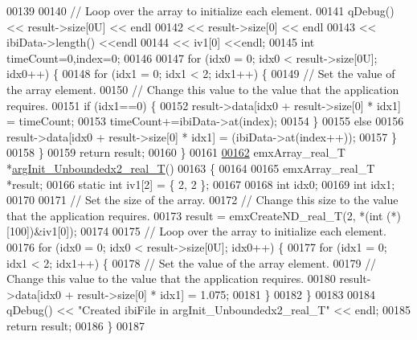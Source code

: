 \begin{DoxyCode}
00139 
00140     \textcolor{comment}{// Loop over the array to initialize each element.}
00141     qDebug() << result->size[0U] << endl
00142             << result->size[0] << endl
00143             << ibiData->length() <<endl
00144             << iv1[0] <<endl;
00145     \textcolor{keywordtype}{int} timeCount=0,index=0;
00146 
00147     \textcolor{keywordflow}{for} (idx0 = 0; idx0 < result->size[0U]; idx0++) \{
00148         \textcolor{keywordflow}{for} (idx1 = 0; idx1 < 2; idx1++) \{
00149             \textcolor{comment}{// Set the value of the array element.}
00150             \textcolor{comment}{// Change this value to the value that the application requires.}
00151             \textcolor{keywordflow}{if} (idx1==0) \{
00152                 result->data[idx0 + result->size[0] * idx1] = timeCount;
00153                 timeCount+=ibiData->at(index);
00154             \}
00155             \textcolor{keywordflow}{else}
00156                 result->data[idx0 + result->size[0] * idx1] = (ibiData->at(index++));
00157         \}
00158     \}
00159     \textcolor{keywordflow}{return} result;
00160 \}
00161 
\hypertarget{hrvanalysis_8cpp_source.tex_l00162}{}\hyperlink{group__HRV-Analysis_ga3bb79c98480ffdfdb826b87cac72be16}{00162} emxArray\_real\_T *\hyperlink{group__HRV-Analysis_ga97aad354e1ec35fab4e98f111f4ed4b4}{argInit\_Unboundedx2\_real\_T}()
00163 \{
00164 
00165     emxArray\_real\_T *result;
00166     \textcolor{keyword}{static} \textcolor{keywordtype}{int} iv1[2] = \{ 2, 2 \};
00167 
00168     \textcolor{keywordtype}{int} idx0;
00169     \textcolor{keywordtype}{int} idx1;
00170 
00171     \textcolor{comment}{// Set the size of the array.}
00172     \textcolor{comment}{// Change this size to the value that the application requires.}
00173     result = emxCreateND\_real\_T(2, *(\textcolor{keywordtype}{int} (*)[100])&iv1[0]);
00174 
00175     \textcolor{comment}{// Loop over the array to initialize each element.}
00176     \textcolor{keywordflow}{for} (idx0 = 0; idx0 < result->size[0U]; idx0++) \{
00177         \textcolor{keywordflow}{for} (idx1 = 0; idx1 < 2; idx1++) \{
00178             \textcolor{comment}{// Set the value of the array element.}
00179             \textcolor{comment}{// Change this value to the value that the application requires.}
00180             result->data[idx0 + result->size[0] * idx1] = 1.075;
00181         \}
00182     \}
00183 
00184     qDebug() << \textcolor{stringliteral}{"Created ibiFile in argInit\_Unboundedx2\_real\_T"} << endl;
00185     \textcolor{keywordflow}{return} result;
00186 \}
00187 
\end{DoxyCode}
